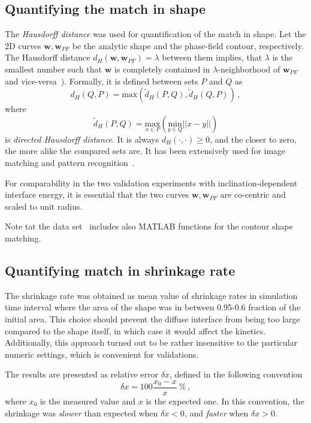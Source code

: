 \subsection{Quantifying the match in shape}
The \textit{Hausdorff distance} was used for quantification of the match in shape. Let the 2D curves $\bm{w},\bm{w}_{PF}$ be the analytic shape and the phase-field contour, respectively. The Hausdorff distance $d_H(\bm{w},\bm{w}_{PF})=\lambda$ between them implies, that $\lambda$ is the smallest number such that $ \bm{w} $ is completely contained in $\lambda$-neighborhood of $\bm{w}_{PF}$ and vice-versa~\cite{Alt2004}). Formally, it is defined between sets $P$ and $Q$ as 
\begin{equation}
	d_H(Q,P)=\mathrm{max}(\tilde{d}_H(P,Q),\tilde{d}_H(Q,P)) \,,
\end{equation}
where 
\begin{equation}
	\tilde{d}_H(P,Q)=\underset{x\in P}{\mathrm{max}}( \underset{y\in Q}{\mathrm{min}}||x-y|| )
\end{equation}
is \textit{directed Hausdorff distance}. It is always $d_H(\cdot,\cdot)\geq 0$, and the closer to zero, the more alike the compared sets are. It has been extensively used for image matching and pattern recognition~\cite{LiZhu2014}. 

For comparability in the two validation experiments with inclination-dependent interface energy, it is essential that the two curves $\bm{w},\bm{w}_{PF}$ are co-centric and scaled to unit radius.

Note tat the data set~\cite{Minar2022dataset} includes also MATLAB functions for the contour shape matching.

\subsection{Quantifying match in shrinkage rate}
The shrinkage rate was obtained as mean value of shrinkage rates in simulation time interval where the area of the shape was in between 0.95-0.6 fraction of the initial area. This choice should prevent the diffuse interface from being too large compared to the shape itself, in which case it would affect the kinetics. Additionally, this approach turned out to be rather insensitive to the particular numeric settings, which is convenient for validations. 

The results are presented as relative error $\delta x$, defined in the following convention
\begin{equation}
	\delta x = 100 \frac{x_0-x}{x}~\%\,,
\end{equation}
where $x_0$ is the measured value and $x$ is the expected one. In this convention, the shrinkage was \textit{slower} than expected when $\delta x<0$, and \textit{faster} when $\delta x > 0$.

